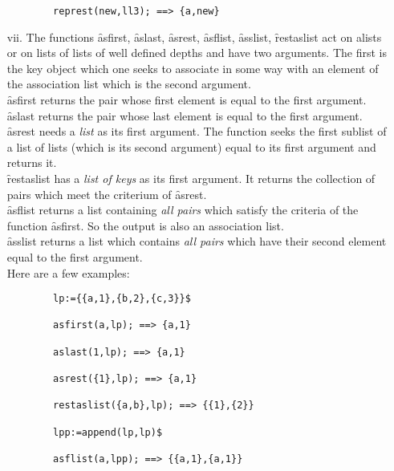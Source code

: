\begin{itemize}
\begin{verbatim}
        represt(new,ll3); ==> {a,new}
\end{verbatim}
\item[vii.]
\hypertarget{operator:ASFIRST}{}
\hypertarget{operator:ASLAST}{}
\hypertarget{operator:ASREST}{}
\hypertarget{operator:ASFLIST}{}
\hypertarget{operator:ASSLIST}{}
\hypertarget{operator:RESTASLIST}{}
The functions \f{asfirst}, \f{aslast}, \f{asrest}, \f{asflist}, \f{asslist}, \f{restaslist}
act on alists or on lists of lists of well defined depths
and have two arguments. The first is the key object
which one seeks to associate in some way with an element of the association
list which is the second argument.\\
\f{asfirst} returns the pair whose first element is equal to the
first argument.\\
\f{aslast} returns the pair whose last element is equal to the first
argument.\\
\f{asrest} needs a \emph{list} as its first argument. The function
seeks the first sublist of a list of lists (which is its second argument)
equal to its first argument and returns it.\\
\f{restaslist} has a \emph{list of keys} as its first argument. It
returns the collection of pairs which meet the criterium of \f{asrest}.\\
\f{asflist} returns a list containing \emph{all pairs} which
satisfy the criteria of the function \f{asfirst}. So the output
is also an association list.\\
\f{asslist} returns a list which contains \emph{all pairs} which have
their second element equal to the first argument.\\
Here are a few examples:
\begin{verbatim}
        lp:={{a,1},{b,2},{c,3}}$

        asfirst(a,lp); ==> {a,1}

        aslast(1,lp); ==> {a,1}

        asrest({1},lp); ==> {a,1}

        restaslist({a,b},lp); ==> {{1},{2}}

        lpp:=append(lp,lp)$

        asflist(a,lpp); ==> {{a,1},{a,1}}


\end{verbatim}
\end{itemize}
